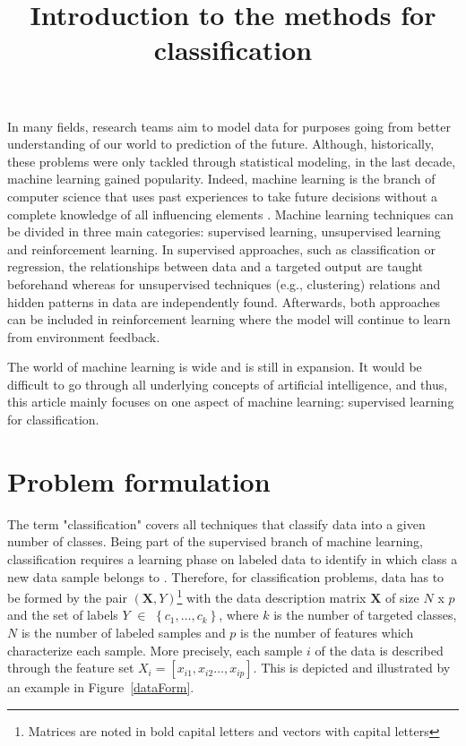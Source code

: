 \documentclass[a4paper,10pt]{article}
\title{Introduction to the methods for classification}
\begin{document}
\sffamily
\maketitle

In many fields, research teams aim to model data for purposes going from better understanding of our world to prediction of the future.
Although, historically, these problems were only tackled through statistical modeling, in the last decade, machine learning gained popularity. Indeed, machine learning is the branch of computer science that uses past experiences to take future decisions without a complete knowledge of all influencing elements \cite{bonaccorso2017machine}. Machine learning techniques can be divided in three main categories: supervised learning, unsupervised learning and reinforcement learning. In supervised approaches, such as classification or regression, the relationships between data and a targeted output are taught beforehand whereas for unsupervised techniques (e.g., clustering) relations and hidden patterns in data are independently found. Afterwards, both approaches can be included in reinforcement learning where the model will continue to learn from environment feedback.

The world of machine learning is wide and is still in expansion. It would be difficult to go through all underlying concepts of artificial intelligence, and thus, this article mainly focuses on one aspect of machine learning: supervised learning for classification.


\section{Problem formulation}
\label{Formulation}
The term "classification" covers all techniques that classify data into a given number of classes. Being part of the supervised branch of machine learning, classification requires a learning phase on labeled data to identify in which class a new data sample belongs to \cite{joshi2017artificial}. Therefore, for classification problems, data has to be formed by the pair $(\bm{X},Y)$\footnote{Matrices are noted in bold capital letters and vectors with capital letters} with the data description matrix $\bm{X}$ of size $N$ x $p$ and the set of labels $Y$ $\in$ $\left\{c_1, \ldots, c_k\right\}$, where $k$ is the number of targeted classes, $N$ is the number of labeled samples and $p$ is the number of features which characterize each sample. More precisely, each sample $i$ of the data is described through the feature set $X_i = [x_{i1}, x_{i2}\ldots, x_{ip}]$.
This is depicted and illustrated by an example in Figure~\ref{dataForm}.
\end{document}
